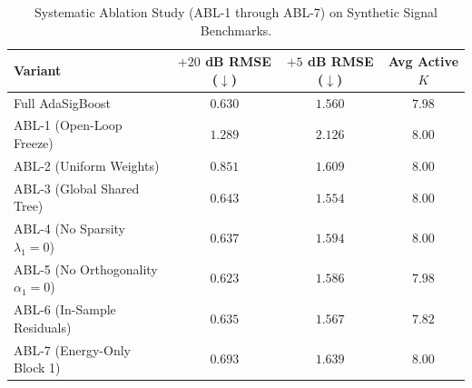 \begin{table}[t]
\centering
\caption{Systematic Ablation Study (ABL-1 through ABL-7) on Synthetic Signal Benchmarks.}
\label{tab:ablations}
\begin{tabular}{lccc}
\toprule
Variant & $+20$ dB RMSE ($\downarrow$) & $+5$ dB RMSE ($\downarrow$) & Avg Active $K$ \\
\midrule
Full AdaSigBoost & $0.630$ & $1.560$ & $7.98$ \\
ABL-1 (Open-Loop Freeze) & $1.289$ & $2.126$ & $8.00$ \\
ABL-2 (Uniform Weights) & $0.851$ & $1.609$ & $8.00$ \\
ABL-3 (Global Shared Tree) & $0.643$ & $1.554$ & $8.00$ \\
ABL-4 (No Sparsity $\lambda_1=0$) & $0.637$ & $1.594$ & $8.00$ \\
ABL-5 (No Orthogonality $\alpha_1=0$) & $0.623$ & $1.586$ & $7.98$ \\
ABL-6 (In-Sample Residuals) & $0.635$ & $1.567$ & $7.82$ \\
ABL-7 (Energy-Only Block 1) & $0.693$ & $1.639$ & $8.00$ \\
\bottomrule
\end{tabular}
\end{table}

